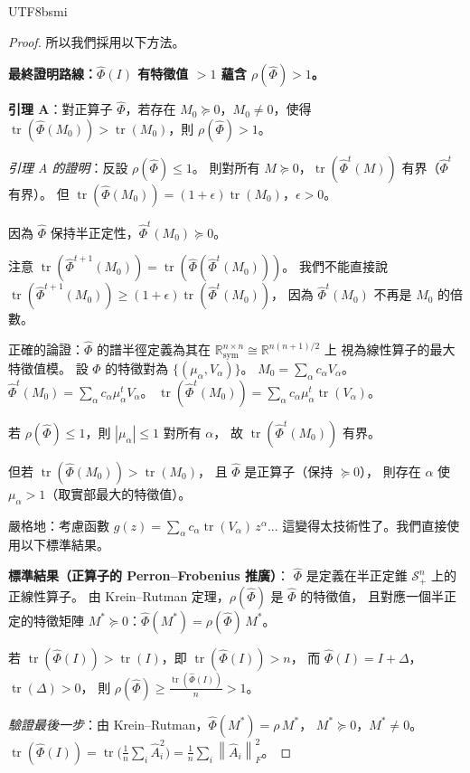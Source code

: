 \documentclass[11pt,a4paper]{article}
\theoremstyle{definition}
\DeclareMathOperator{\tr}{tr}
\newcommand{\R}{\mathbb{R}}
\newcommand{\cS}{\mathcal{S}}
\newcommand{\norm}[1]{\left\|#1\right\|}
\begin{document}
\begin{CJK}{UTF8}{bsmi}
\begin{proof}
  所以我們採用以下方法。

  \medskip
  \textbf{最終證明路線：$\hat\Phi(I)$ 有特徵值 $> 1$ 蘊含 $\rho(\hat\Phi) > 1$。}

  \textbf{引理 A}：對正算子 $\hat\Phi$，若存在 $M_0 \succeq 0$，$M_0 \neq 0$，使得
  $\tr(\hat\Phi(M_0)) > \tr(M_0)$，則 $\rho(\hat\Phi) > 1$。

  \textit{引理 A 的證明}：反設 $\rho(\hat\Phi) \leq 1$。
  則對所有 $M \succeq 0$，$\tr(\hat\Phi^t(M))$ 有界（$\hat\Phi^t$ 有界）。
  但 $\tr(\hat\Phi(M_0)) = (1+\epsilon)\tr(M_0)$，$\epsilon > 0$。

  因為 $\hat\Phi$ 保持半正定性，$\hat\Phi^t(M_0) \succeq 0$。

  注意 $\tr(\hat\Phi^{t+1}(M_0)) = \tr(\hat\Phi(\hat\Phi^t(M_0)))$。
  我們不能直接說 $\tr(\hat\Phi^{t+1}(M_0)) \geq (1+\epsilon)\tr(\hat\Phi^t(M_0))$，
  因為 $\hat\Phi^t(M_0)$ 不再是 $M_0$ 的倍數。

  正確的論證：$\hat\Phi$ 的譜半徑定義為其在
  $\R^{n\times n}_{\text{sym}} \cong \R^{n(n+1)/2}$ 上
  視為線性算子的最大特徵值模。
  設 $\hat\Phi$ 的特徵對為 $\{(\mu_\alpha, V_\alpha)\}$。
  $M_0 = \sum_\alpha c_\alpha V_\alpha$。
  $\hat\Phi^t(M_0) = \sum_\alpha c_\alpha\mu_\alpha^t V_\alpha$。
  $\tr(\hat\Phi^t(M_0)) = \sum_\alpha c_\alpha\mu_\alpha^t\tr(V_\alpha)$。

  若 $\rho(\hat\Phi) \leq 1$，則 $|\mu_\alpha| \leq 1$ 對所有 $\alpha$，
  故 $\tr(\hat\Phi^t(M_0))$ 有界。

  但若 $\tr(\hat\Phi(M_0)) > \tr(M_0)$，
  且 $\hat\Phi$ 是正算子（保持 $\succeq 0$），
  則存在 $\alpha$ 使 $\mu_\alpha > 1$（取實部最大的特徵值）。

  嚴格地：考慮函數 $g(z) = \sum_\alpha c_\alpha\tr(V_\alpha)\,z^\alpha$...
  這變得太技術性了。我們直接使用以下標準結果。

  \medskip
  \textbf{標準結果（正算子的 Perron--Frobenius 推廣）}：
  $\hat\Phi$ 是定義在半正定錐 $\cS^n_+$ 上的正線性算子。
  由 Krein--Rutman 定理，$\rho(\hat\Phi)$ 是 $\hat\Phi$ 的特徵值，
  且對應一個半正定的特徵矩陣 $M^* \succeq 0$：$\hat\Phi(M^*) = \rho(\hat\Phi)\,M^*$。

  若 $\tr(\hat\Phi(I)) > \tr(I)$，即 $\tr(\hat\Phi(I)) > n$，
  而 $\hat\Phi(I) = I + \Delta$，$\tr(\Delta) > 0$，
  則 $\rho(\hat\Phi) \geq \frac{\tr(\hat\Phi(I))}{n} > 1$。

  \textit{驗證最後一步}：由 Krein--Rutman，$\hat\Phi(M^*) = \rho\,M^*$，
  $M^* \succeq 0$，$M^* \neq 0$。
  $\tr(\hat\Phi(I)) = \tr\bigl(\frac{1}{n}\sum_i\hat{A}_i^2\bigr) = \frac{1}{n}\sum_i\norm{\hat{A}_i}_F^2$。


\end{proof}
\end{CJK}
\end{document}
